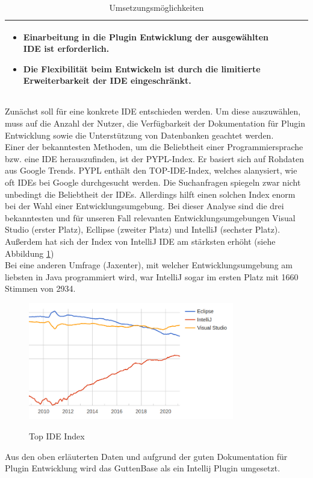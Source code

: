 \begin{table}
\begin{tabular}{ |p{3cm}|p{6cm}|p{6cm}| }
			\begin{itemize}
				\item Einarbeitung in die Plugin Entwicklung der ausgewählten IDE ist erforderlich.
				\item Die Flexibilität beim Entwickeln ist durch die limitierte Erweiterbarkeit der IDE eingeschränkt.
			\end{itemize} \\
			\hline
		
		\end{tabular}
	\caption{Umsetzungsmöglichkeiten}
	\label{table:tool-options}
\end{table}

Zunächst soll für eine konkrete IDE entschieden werden. Um diese auszuwählen, muss auf die Anzahl der Nutzer, die Verfügbarkeit der Dokumentation für Plugin Entwicklung sowie die Unterstützung von Datenbanken geachtet werden.\\
Einer der bekanntesten Methoden, um die Beliebtheit einer Programmiersprache bzw. eine IDE herauszufinden, ist der PYPL-Index. Er basiert sich auf Rohdaten aus Google Trends. PYPL enthält den TOP-IDE-Index, welches alanysiert, wie oft IDEs bei Google durchgesucht werden. Die Suchanfragen spiegeln zwar nicht unbedingt die Beliebtheit der IDEs. Allerdings hilft einen solchen Index enorm bei der Wahl einer Entwicklungsumgebung.
Bei dieser Analyse sind die drei bekanntesten und für unseren Fall relevanten Entwicklungsumgebungen Visual Studio (erster Platz), Ecllipse (zweiter Platz) und IntelliJ (sechster Platz). Außerdem hat sich der Index von IntelliJ IDE am stärksten erhöht (siehe Abbildung \ref{img:ide-index})\\
Bei eine anderen Umfrage (Jaxenter), mit welcher Entwicklungsumgebung am liebsten in Java programmiert wird, war IntelliJ sogar im ersten Platz mit 1660 Stimmen von 2934. \\

\begin{figure}[H]
	\caption{Top IDE Index}
	\centering
	\includegraphics[width=0.8\textwidth]{images/ide-index}
	\label{img:ide-index}
\end{figure}
Aus den oben erläuterten Daten und aufgrund der guten Dokumentation für Plugin Entwicklung wird das GuttenBase als ein Intellij Plugin umgesetzt. 






